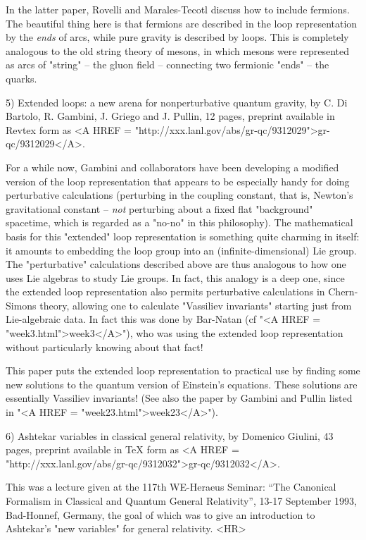 In the latter paper, Rovelli and Marales-Tecotl discuss how to include
fermions.  The beautiful thing here is that fermions are described
in the loop representation by the \emph{ends} of arcs, while pure gravity is
described by loops.  This is completely analogous to the old string
theory of mesons, in which mesons were represented as arcs of "string"
-- the gluon field -- connecting two fermionic "ends" -- the quarks.  

5) Extended loops: a new arena for nonperturbative quantum gravity, 
by C. Di Bartolo, R. Gambini, J. Griego and J. Pullin, 12 pages,
preprint available in Revtex form as <A HREF = "http://xxx.lanl.gov/abs/gr-qc/9312029">gr-qc/9312029</A>.

For a while now, Gambini and collaborators have been developing a
modified version of the loop representation that appears to be
especially handy for doing perturbative calculations (perturbing in the
coupling constant, that is, Newton's gravitational constant -- \emph{not}
perturbing about a fixed flat "background" spacetime, which is regarded
as a "no-no" in this philosophy).  The mathematical basis for this
"extended" loop representation is something quite charming in itself: it
amounts to embedding the loop group into an (infinite-dimensional) Lie
group.  The "perturbative" calculations described above are thus
analogous to how one uses Lie algebras to study Lie groups.  In fact,
this analogy is a deep one, since the extended loop representation also
permits perturbative calculations in Chern-Simons theory, allowing one
to calculate "Vassiliev invariants" starting just from Lie-algebraic
data.  In fact this was done by Bar-Natan (cf "<A HREF = "week3.html">week3</A>"), who was using
the extended loop representation without particularly knowing about that
fact!

This paper puts the extended loop representation to practical use by
finding some new solutions to the quantum version of Einstein's
equations.   These solutions are essentially Vassiliev invariants!
(See also the paper by Gambini and Pullin listed in "<A HREF = "week23.html">week23</A>").  

6) Ashtekar variables in classical general relativity, by Domenico
Giulini, 43 pages, preprint available in TeX form as <A HREF = "http://xxx.lanl.gov/abs/gr-qc/9312032">gr-qc/9312032</A>.

This was a lecture given at the 117th WE-Heraeus Seminar: ``The Canonical
Formalism in Classical and Quantum General Relativity'', 13-17
September 1993, Bad-Honnef, Germany, the goal of which was to give an
introduction to Ashtekar's "new variables" for general relativity.
<HR>




